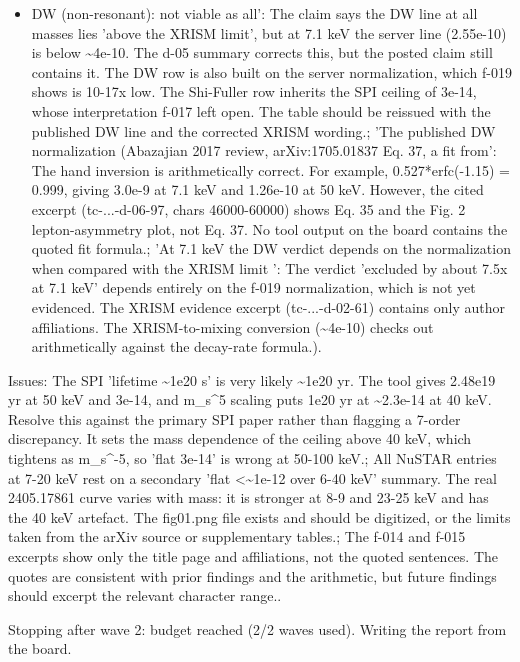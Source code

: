 \documentclass[11pt,a4paper]{article}
\begin{document}
\begin{itemize}
  \item DW (non-resonant): not viable as all': The claim says the DW line at all masses lies 'above the XRISM limit', but at 7.1 keV the server line (2.55e-10) is below \textasciitilde{}4e-10. The d-05 summary corrects this, but the posted claim still contains it. The DW row is also built on the server normalization, which f-019 shows is 10-17x low. The Shi-Fuller row inherits the SPI ceiling of 3e-14, whose interpretation f-017 left open. The table should be reissued with the published DW line and the corrected XRISM wording.; 'The published DW normalization (Abazajian 2017 review, arXiv:1705.01837 Eq. 37, a fit from': The hand inversion is arithmetically correct. For example, 0.527*erfc(-1.15) = 0.999, giving 3.0e-9 at 7.1 keV and 1.26e-10 at 50 keV. However, the cited excerpt (tc-...-d-06-97, chars 46000-60000) shows Eq. 35 and the Fig. 2 lepton-asymmetry plot, not Eq. 37. No tool output on the board contains the quoted fit formula.; 'At 7.1 keV the DW verdict depends on the normalization when compared with the XRISM limit ': The verdict 'excluded by about 7.5x at 7.1 keV' depends entirely on the f-019 normalization, which is not yet evidenced. The XRISM evidence excerpt (tc-...-d-02-61) contains only author affiliations. The XRISM-to-mixing conversion (\textasciitilde{}4e-10) checks out arithmetically against the decay-rate formula.).
\end{itemize}
Issues: The SPI 'lifetime \textasciitilde{}1e20 s' is very likely \textasciitilde{}1e20 yr. The tool gives 2.48e19 yr at 50 keV and 3e-14, and m\_s\textasciicircum{}5 scaling puts 1e20 yr at \textasciitilde{}2.3e-14 at 40 keV. Resolve this against the primary SPI paper rather than flagging a 7-order discrepancy. It sets the mass dependence of the ceiling above 40 keV, which tightens as m\_s\textasciicircum{}-5, so 'flat 3e-14' is wrong at 50-100 keV.; All NuSTAR entries at 7-20 keV rest on a secondary 'flat \textless{}\textasciitilde{}1e-12 over 6-40 keV' summary. The real 2405.17861 curve varies with mass: it is stronger at 8-9 and 23-25 keV and has the 40 keV artefact. The fig01.png file exists and should be digitized, or the limits taken from the arXiv source or supplementary tables.; The f-014 and f-015 excerpts show only the title page and affiliations, not the quoted sentences. The quotes are consistent with prior findings and the arithmetic, but future findings should excerpt the relevant character range..

Stopping after wave 2: budget reached (2/2 waves used). Writing the report from the board.
\end{document}
